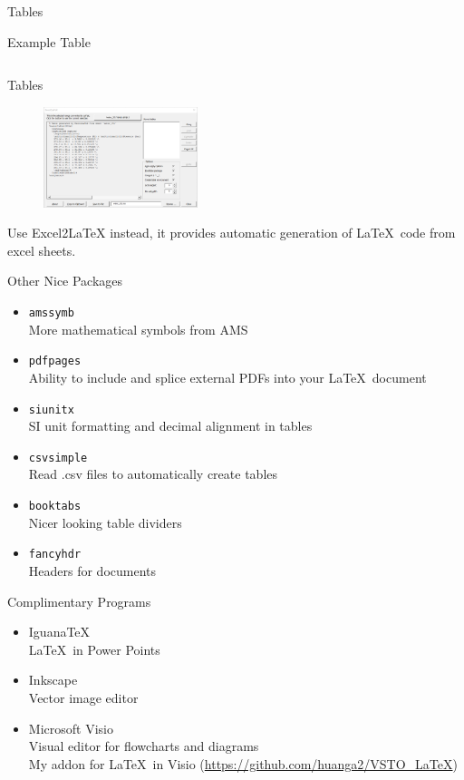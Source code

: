 \begin{frame}{\insertsection}{Tables}
		\begin{block}{Example Table}
		\inputminted[numbers=none]{latex}{./Example_Codes/table.tex}
	\end{block}
\end{frame}

\begin{frame}{\insertsection}{Tables}
	\begin{figure}
		\includegraphics[width=0.4\textwidth]{./Images/excel2latex.png}
	\end{figure}
	Use Excel2LaTeX instead, it provides automatic generation of \LaTeX\ code from excel sheets.
\end{frame}

\begin{frame}{Other Nice Packages}
	\begin{itemize}
		\item \texttt{amssymb}\\
		More mathematical symbols from AMS
		\item \texttt{pdfpages}\\
		Ability to include and splice external PDFs into your \LaTeX\ document
		\item \texttt{siunitx}\\
		SI unit formatting and decimal alignment in tables
		\item \texttt{csvsimple}\\
		Read .csv files to automatically create tables
		\item \texttt{booktabs}\\
		Nicer looking table dividers
		\item \texttt{fancyhdr}\\	
		Headers for documents	
	\end{itemize}
\end{frame}

\begin{frame}{Complimentary Programs}
	\begin{itemize}
		\item IguanaTeX\\
		\LaTeX\ in Power Points
		\item Inkscape\\
		Vector image editor
		\item Microsoft Visio\\
		Visual editor for flowcharts and diagrams\\
		My addon for \LaTeX\ in Visio (\url{https://github.com/huanga2/VSTO_LaTeX})
	\end{itemize}
\end{frame}

